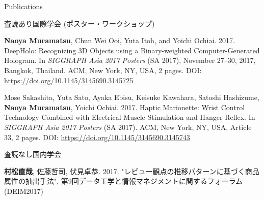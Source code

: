 \documentclass{resume} %
\begin{document}
\begin{rSection}{Publications}
\begin{rSubsection}{査読あり国際学会 (ポスター・ワークショップ)}{}{}{}{}
        \item \textbf{Naoya Muramatsu}, Chun Wei Ooi, Yuta Itoh, and Yoichi Ochiai. 2017. DeepHolo: Recognizing 3D Objects using a Binary-weighted Computer-Generated Hologram. In \textit{SIGGRAPH Asia 2017 Posters} (SA 2017), November 27--30, 2017, Bangkok, Thailand. ACM, New York, NY, USA, 2 pages. DOI: \url{https://doi.org/10.1145/3145690.3145725}

        \item Mose Sakashita, Yuta Sato, Ayaka Ebisu, Keisuke Kawahara, Satoshi Hashizume, \textbf{Naoya Muramatsu}, Yoichi Ochiai. 2017. Haptic Marionette: Wrist Control Technology Combined with Electrical Muscle Stimulation and Hanger Reflex. In \textit{SIGGRAPH Asia 2017 Posters} (SA 2017). ACM, New York, NY, USA, Article 33, 2 pages. DOI: \url{https://doi.org/10.1145/3145690.3145743}
    \end{rSubsection}



    \begin{rSubsection}{査読なし国内学会}{}{}{}{}
        \item \textbf{村松直哉}, 佐藤哲司, 伏見卓恭. 2017. "レビュー観点の推移パターンに基づく商品属性の抽出手法", 第9回データ工学と情報マネジメントに関するフォーラム (DEIM2017)
    \end{rSubsection}




\end{rSection}
\end{document}
